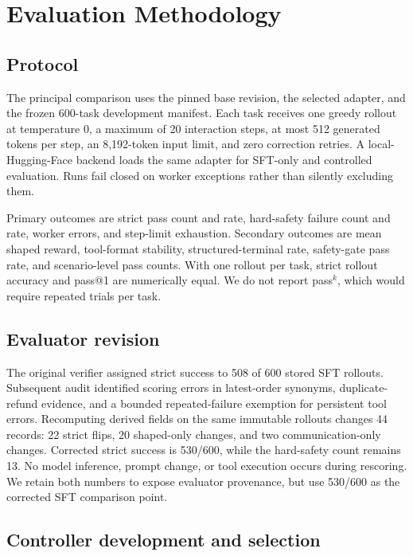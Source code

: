 \documentclass[11pt]{article}
\begin{document}
\section{Evaluation Methodology}
\label{sec:evaluation}

\subsection{Protocol}

The principal comparison uses the pinned base revision, the selected adapter, and the frozen 600-task development manifest. Each task receives one greedy rollout at temperature 0, a maximum of 20 interaction steps, at most 512 generated tokens per step, an 8,192-token input limit, and zero correction retries. A local-Hugging-Face backend loads the same adapter for SFT-only and controlled evaluation. Runs fail closed on worker exceptions rather than silently excluding them.

Primary outcomes are strict pass count and rate, hard-safety failure count and rate, worker errors, and step-limit exhaustion. Secondary outcomes are mean shaped reward, tool-format stability, structured-terminal rate, safety-gate pass rate, and scenario-level pass counts. With one rollout per task, strict rollout accuracy and pass@1 are numerically equal. We do not report pass$^k$, which would require repeated trials per task.

\subsection{Evaluator revision}

The original verifier assigned strict success to 508 of 600 stored SFT rollouts. Subsequent audit identified scoring errors in latest-order synonyms, duplicate-refund evidence, and a bounded repeated-failure exemption for persistent tool errors. Recomputing derived fields on the same immutable rollouts changes 44 records: 22 strict flips, 20 shaped-only changes, and two communication-only changes. Corrected strict success is 530/600, while the hard-safety count remains 13. No model inference, prompt change, or tool execution occurs during rescoring. We retain both numbers to expose evaluator provenance, but use 530/600 as the corrected SFT comparison point.

\subsection{Controller development and selection}
\end{document}
